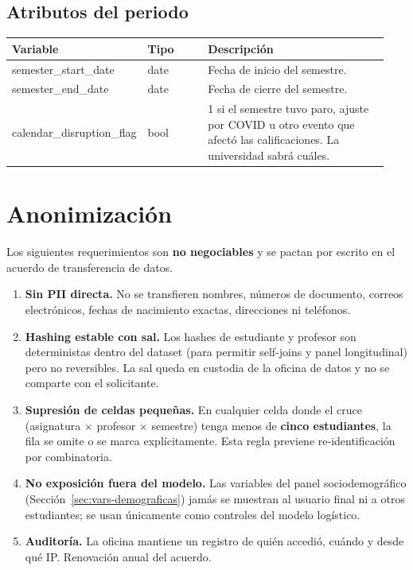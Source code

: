 \documentclass[11pt,a4paper]{article}
\begin{document}
\subsection{Atributos del periodo}

\begin{longtable}{@{}>{\ttfamily}p{0.30\linewidth}p{0.16\linewidth}p{0.48\linewidth}@{}}
\toprule
\rmfamily\textbf{Variable} & \textbf{Tipo} & \textbf{Descripción} \\
\midrule
\endhead
semester\_start\_date       & date  & Fecha de inicio del semestre. \\
semester\_end\_date         & date  & Fecha de cierre del semestre. \\
calendar\_disruption\_flag  & bool  & 1 si el semestre tuvo paro, ajuste por COVID u otro evento que afectó las calificaciones. La universidad sabrá cuáles. \\
\bottomrule
\end{longtable}

\section{Anonimización}
\label{sec:anonimizacion}

Los siguientes requerimientos son \textbf{no negociables} y se pactan por escrito en el acuerdo de transferencia de datos.

\begin{enumerate}
\item \textbf{Sin PII directa.} No se transfieren nombres, números de documento, correos electrónicos, fechas de nacimiento exactas, direcciones ni teléfonos.

\item \textbf{Hashing estable con sal.} Los hashes de estudiante y profesor son deterministas dentro del dataset (para permitir self-joins y panel longitudinal) pero no reversibles. La sal queda en custodia de la oficina de datos y no se comparte con el solicitante.

\item \textbf{Supresión de celdas pequeñas.} En cualquier celda donde el cruce (asignatura $\times$ profesor $\times$ semestre) tenga menos de \textbf{cinco estudiantes}, la fila se omite o se marca explícitamente. Esta regla previene re-identificación por combinatoria.

\item \textbf{No exposición fuera del modelo.} Las variables del panel sociodemográfico (Sección~\ref{sec:vars-demograficas}) jamás se muestran al usuario final ni a otros estudiantes; se usan únicamente como controles del modelo logístico.

\item \textbf{Auditoría.} La oficina mantiene un registro de quién accedió, cuándo y desde qué IP. Renovación anual del acuerdo.
\end{enumerate}
\end{document}
